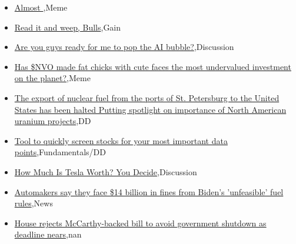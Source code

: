 \documentclass{article}%
\begin{document}
%
\begin{itemize}%
\item%
\href{https://reddit.com/r/wallstreetbets/comments/16w020q/almost/}{Almost },Meme%
\item%
\href{https://reddit.com/r/wallstreetbets/comments/16vz0dq/read\_it\_and\_weep\_bulls/}{Read it and weep, Bulls},Gain%
\item%
\href{https://reddit.com/r/wallstreetbets/comments/16vytg3/are\_you\_guys\_ready\_for\_me\_to\_pop\_the\_ai\_bubble/}{Are you guys ready for me to pop the AI bubble?},Discussion%
\item%
\href{https://reddit.com/r/wallstreetbets/comments/16vxpo3/has\_nvo\_made\_fat\_chicks\_with\_cute\_faces\_the\_most/}{Has \$NVO made fat chicks with cute faces the most undervalued investment on the planet?},Meme%
\item%
\href{https://reddit.com/r/Baystreetbets/comments/16vevui/the\_export\_of\_nuclear\_fuel\_from\_the\_ports\_of\_st/}{The export of nuclear fuel from the ports of St. Petersburg to the United States has been halted  Putting spotlight on importance of North American uranium projects},DD%
\item%
\href{https://reddit.com/r/StockMarket/comments/16w2ejf/tool\_to\_quickly\_screen\_stocks\_for\_your\_most/}{Tool to quickly screen stocks for your most important data points},Fundamentals/DD%
\item%
\href{https://reddit.com/r/StockMarket/comments/16uhst7/how\_much\_is\_tesla\_worth\_you\_decide/}{How Much Is Tesla Worth? You Decide},Discussion%
\item%
\href{https://reddit.com/r/Economics/comments/16vu2wc/automakers\_say\_they\_face\_14\_billion\_in\_fines\_from/}{Automakers say they face \$14 billion in fines from Biden's 'unfeasible' fuel rules},News%
\item%
\href{https://reddit.com/r/Economics/comments/16vkf0k/house\_rejects\_mccarthybacked\_bill\_to\_avoid/}{House rejects McCarthy-backed bill to avoid government shutdown as deadline nears},nan%
\end{itemize}%
\end{document}
